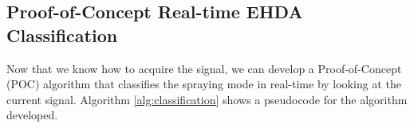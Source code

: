 \documentclass[oneside,12pt]{article}
\begin{document}







\subsection{Proof-of-Concept Real-time EHDA Classification}\label{sec:classification-algorithm}

Now that we know how to acquire the signal, we can develop a Proof-of-Concept (POC)
algorithm that classifies the spraying mode in real-time by looking at the current signal.
Algorithm \ref{alg:classification} shows a pseudocode for the algorithm developed.
\end{document}
